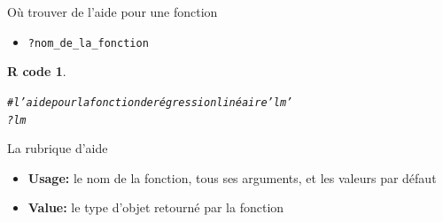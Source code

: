 \documentclass[11pt]{beamer}\usepackage[]{graphicx}\usepackage[]{color}
\makeatletter
\newcommand{\hlcom}[1]{\textcolor[rgb]{0.588,0.588,0.588}{#1}}%
\newcommand{\hlopt}[1]{\textcolor[rgb]{0.196,0.196,0.196}{#1}}%
\newcommand{\hlstd}[1]{\textcolor[rgb]{0.196,0.196,0.196}{#1}}%
\newenvironment{kframe}{%
 \def\at@end@of@kframe{}%
 \ifinner\ifhmode%
  \def\at@end@of@kframe{\end{minipage}}%
  \begin{minipage}{\columnwidth}%
 \fi\fi%
 \def\FrameCommand##1{\hskip\@totalleftmargin \hskip-\fboxsep
 \colorbox{shadecolor}{##1}\hskip-\fboxsep
     \hskip-\linewidth \hskip-\@totalleftmargin \hskip\columnwidth}%
 \MakeFramed {\advance\hsize-\width
   \@totalleftmargin\z@ \linewidth\hsize
   \@setminipage}}%
 {\par\unskip\endMakeFramed%
 \at@end@of@kframe}
\newenvironment{knitrout}{}{} %
\newtheorem{rcode}{R code}[section]
\newcommand{\code}[1]{\texttt{#1}}
\makeatother
\begin{document}
\begin{frame}[fragile]{O\`{u} trouver de l'aide pour une fonction}
\begin{itemize}
  \setlength\itemsep{2em}
\item \mbox{\texttt{?nom\_de\_la\_fonction}}
\end{itemize}

\pause 
\begin{knitrout}
\color{fgcolor}\begin{kframe}
\begin{rcode}\label{unnamed-chunk-2}\begin{alltt}
\hlcom{# l'aide pour la fonction de régression linéaire 'lm'}
\hlopt{?}\hlstd{lm}
\end{alltt}
\end{rcode}\end{kframe}
\end{knitrout}
\end{frame}


\begin{frame}{La rubrique d'aide}
\begin{itemize}
  \setlength\itemsep{2em}
\item \textbf{Usage:} le nom de la fonction, tous ses arguments, et les valeurs par défaut
\pause \item \textbf{Value:} le type d'objet retourné par la fonction
\end{itemize}
\end{frame}


\end{document}
